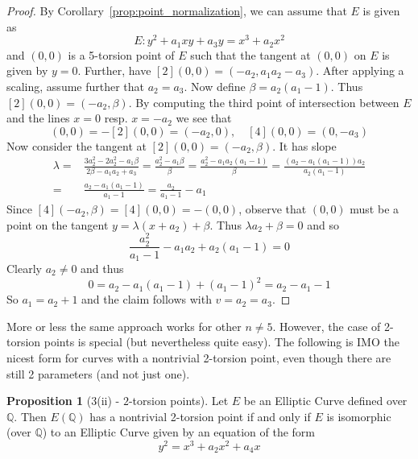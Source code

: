 \documentclass{scrartcl}
\newcommand{\Q}{\mathbb{Q}}
\theoremstyle{definition}
\newtheorem{prop}[subsection]{Proposition}
\begin{document}
\begin{proof}
    By Corollary~\ref{prop:point_normalization}, we can assume that $E$ is given as
    \begin{equation*}
        E: y^2 + a_1 x y + a_3 y = x^3 + a_2 x^2
    \end{equation*}
    and $(0, 0)$ is a 5-torsion point of $E$ such that the tangent at $(0, 0)$ on $E$ is given by $y = 0$.
    Further, have $[2](0, 0) = (-a_2, a_1 a_2 - a_3)$.
    After applying a scaling, assume further that $a_2 = a_3$.
    Now define $\beta = a_2(a_1 - 1)$.
    Thus $[2](0, 0) = (-a_2, \beta)$.
    By computing the third point of intersection between $E$ and the lines $x = 0$ resp. $x = -a_2$ we see that 
    \begin{equation*}
        [3](0, 0) = -[2](0, 0) = (-a_2, 0), \quad [4](0, 0) = (0, -a_3)
    \end{equation*}
    Now consider the tangent at $[2](0, 0) = (-a_2, \beta)$.
    It has slope
    \begin{align*}
        \lambda =& \frac {3 a_2^2 - 2 a_2^2 - a_1 \beta} {2\beta - a_1 a_2 + a_3} = \frac {a_2^2 - a_1\beta} \beta = \frac {a_2^2 - a_1a_2(a_1 - 1)} \beta = \frac {(a_2 - a_1(a_1 - 1))a_2} {a_2(a_1 - 1)} \\
        =& \frac {a_2 - a_1(a_1 - 1)} {a_1 - 1} = \frac {a_2} {a_1 - 1} - a_1
    \end{align*}
    Since $[4](-a_2, \beta) = [4](0, 0) = -(0, 0)$, observe that $(0, 0)$ must be a point on the tangent $y = \lambda (x + a_2) + \beta$.
    Thus $\lambda a_2 + \beta = 0$ and so
    \begin{equation*}
        \frac {a_2^2} {a_1 - 1} - a_1 a_2 + a_2(a_1 - 1) = 0
    \end{equation*}
    Clearly $a_2 \neq 0$ and thus
    \begin{equation*}
        0 = a_2 - a_1 (a_1 - 1) + (a_1 - 1)^2 = a_2 - a_1 - 1
    \end{equation*}
    So $a_1 = a_2 + 1$ and the claim follows with $v = a_2 = a_3$.
\end{proof}
More or less the same approach works for other $n \neq 5$.
However, the case of 2-torsion points is special (but nevertheless quite easy).
The following is IMO the nicest form for curves with a nontrivial 2-torsion point, even though there are still 2 parameters (and not just one).
\begin{prop}[3(ii) - $2$-torsion points]
    Let $E$ be an Elliptic Curve defined over $\Q$.
    Then $E(\Q)$ has a nontrivial 2-torsion point if and only if $E$ is isomorphic (over $\Q$) to an Elliptic Curve given by an equation of the form
    \begin{equation*}
        y^2 = x^3 + a_2 x^2 + a_4 x
    \end{equation*}
\end{prop}
\end{document}
